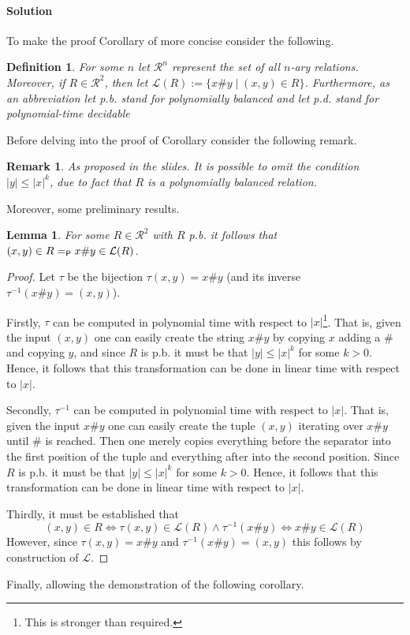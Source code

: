 \documentclass [11pt]{article}
\newcommand{\ccfont}[1]{\protect\mathsf{#1}}
\newcommand{\Ptime}{\ccfont{P}}
\newtheorem{lemma}[theorem]{Lemma}
\newtheorem{definition}[theorem]{Definition}
\newtheorem{remark}[theorem]{Remark}
\begin{document}
\medskip

\paragraph*{Solution}

To make the proof Corollary \label{cor:main} of more concise consider the following.
\begin{definition}
For some $n$ let $\mathcal{R}^n$ represent the set of all $n$-ary relations.
Moreover, if $R \in \mathcal{R}^2$, then let $\mathcal{L}(R):= \{x\# y \mid (x,y) \in R\}$.
Furthermore, as an abbreviation let p.b. stand for polynomially balanced and let p.d. stand for polynomial-time decidable
\end{definition}
Before delving into the proof of Corollary \label{cor:main} consider the following remark.
\begin{remark}
As proposed in the slides. It is possible to omit the condition $|y| \leq |x|^k$,  due to fact that $R$ is a polynomially balanced relation.
\end{remark}

Moreover, some preliminary results. 

\begin{lemma}
\label{lem:lang-rel}
For some $R \in \mathcal{R}^2$ with $R$ p.b. it follows that $(x,y) \in R =_{\Ptime} x\#y \in \mathcal{L}(R)$.
\end{lemma}
\begin{proof}
Let $\tau$ be the bijection $\tau(x,y) = x\#y$ (and its inverse $\tau^{-1}(x\#y) = (x,y)$).

Firstly, $\tau$ can be computed in polynomial time with respect to $|x|$\footnote{This is stronger than required.}. That is, given the input $(x,y)$ one can easily create the string $x\#y$ by copying $x$ adding a $\#$ and copying $y$, and since $R$ is p.b. it must be that $|y| \leq |x|^k$ for some $k >0$. Hence, it follows that this transformation can be done in linear time with respect to $|x|$.

Secondly, $\tau^{-1}$ can be computed in polynomial time with respect to $|x|$. That is, given the input $x\#y$ one can easily create the tuple $(x,y)$ iterating over $x\#y$ until $\#$ is reached. Then one merely copies everything before the separator into the first position of the tuple and everything after into the second position. Since $R$ is p.b. it must be that $|y| \leq |x|^k$ for some $k >0$. Hence, it follows that this transformation can be done in linear time with respect to $|x|$.


Thirdly, it must be established that 
\begin{equation*}
(x,y) \in R \iff \tau(x,y) \in \mathcal{L}(R) \land \tau^{-1}(x\#y) \iff x\#y \in \mathcal{L}(R)
\end{equation*}
However, since $\tau(x,y)=x\#y$ and $\tau^{-1}(x\#y)=(x,y)$ this follows by construction of $\mathcal{L}$.
\end{proof}
Finally, allowing the demonstration of the following corollary.
\end{document}
